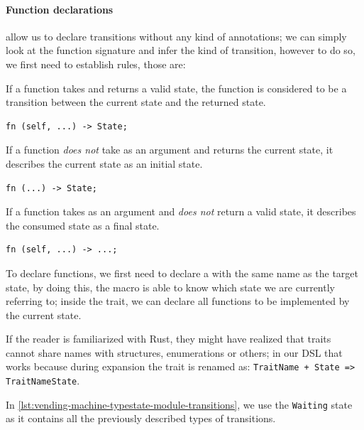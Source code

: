 \paragraph{Function declarations} allow us to declare transitions without any kind of annotations;
we can simply look at the function signature and infer the kind of transition,
however to do so, we first need to establish rules, those are:

\begin{compactitem}
    \item If a function takes  and returns a valid state,
    the function is considered to be a transition between the current state and the returned state.
    \begin{verbatim}
fn (self, ...) -> State;
    \end{verbatim}
    \item If a function \emph{does not} take  as an argument and returns the current state,
    it describes the current state as an initial state.
    \begin{verbatim}
fn (...) -> State;
    \end{verbatim}
    \item If a function takes  as an argument and \emph{does not} return a valid state,
    it describes the consumed state as a final state.
    \begin{verbatim}
fn (self, ...) -> ...;
    \end{verbatim}
\end{compactitem}

To declare functions, we first need to declare a  with the same name as the target state,
by doing this, the macro is able to know which state we are currently referring to;
inside the trait, we can declare all functions to be implemented by the current state.

If the reader is familiarized with Rust, they might have realized that traits cannot share names with structures,
enumerations or others; in our DSL that works because during expansion the trait is renamed as: \texttt{TraitName + State => TraitNameState}.

In \autoref{lst:vending-machine-typestate-module-transitions},
we use the \texttt{Waiting} state as it contains all the previously described types of transitions.

